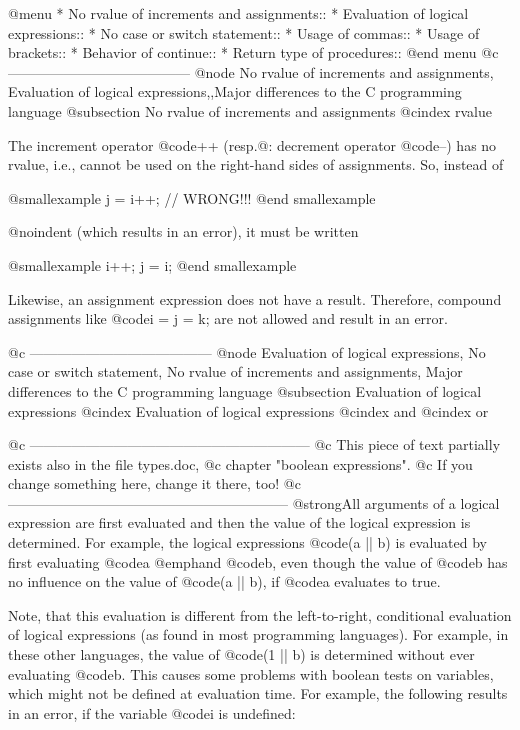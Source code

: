 @menu
* No rvalue of increments and assignments::
* Evaluation of logical expressions::
* No case or switch statement::
* Usage of commas::
* Usage of brackets::
* Behavior of continue::
* Return type of procedures::
@end menu
@c ---------------------------------------
@node No rvalue of increments and assignments, Evaluation of logical expressions,,Major differences to the C programming language
@subsection No rvalue of increments and assignments
@cindex rvalue

The increment operator @code{++} (resp.@: decrement operator @code{--})
has no rvalue, i.e., cannot be used on the right-hand sides of
assignments.  So, instead of

@smallexample
j = i++;  // WRONG!!!
@end smallexample

@noindent (which results in an error), it must be written

@smallexample
i++; j = i;
@end smallexample

Likewise, an assignment expression does not have a result.  Therefore,
compound assignments like @code{i = j = k;} are not allowed and result
in an error.

@c ---------------------------------------
@node Evaluation of logical expressions, No case or switch statement, No rvalue of increments and assignments, Major differences to the C programming language
@subsection Evaluation of logical expressions
@cindex Evaluation of logical expressions
@cindex and
@cindex or

@c ------------------------------------------------------------
@c   This piece of text partially exists also in the file types.doc,
@c   chapter "boolean expressions".
@c   If you change something here, change it there, too!
@c ------------------------------------------------------------
@strong{All} arguments of a logical expression are first evaluated and
then the value of the logical expression is determined. For example, the
logical expressions @code{(a || b)} is evaluated by first evaluating
@code{a} @emph{and} @code{b}, even though the value of @code{b} has no
influence on the value of @code{(a || b)}, if @code{a} evaluates to
true. 

Note, that this evaluation is different from the left-to-right,
conditional evaluation of logical expressions (as found in most
programming languages). For example, in these other languages, the value
of @code{(1 || b)} is determined without ever evaluating @code{b}.  This
causes some problems with boolean tests on variables, which might not be
defined at evaluation time. For example, the following results in an
error, if the variable @code{i} is undefined:

